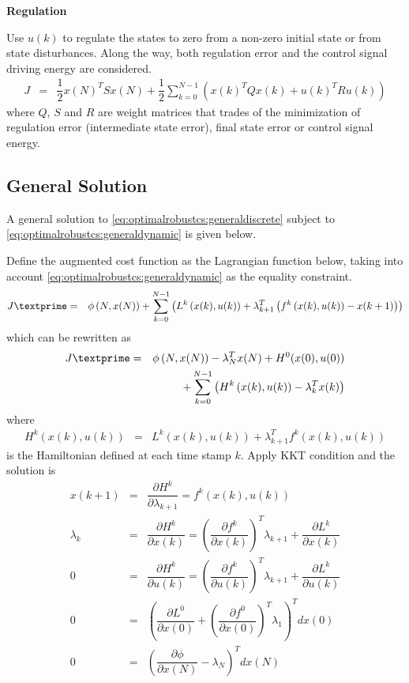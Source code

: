 \vspace{0.1in}
\noindent \textbf{Regulation}
\vspace{0.1in}

Use $u(k)$ to regulate the states to zero  from a non-zero initial state or from state disturbances. Along the way, both regulation error and the control signal driving energy are considered.
\begin{eqnarray}
  J &=& \dfrac{1}{2}x(N)^TSx(N) + \dfrac{1}{2}\sum_{k=0}^{N-1}\left(x(k)^TQx(k) + u(k)^TRu(k)\right) \nonumber
\end{eqnarray}
where $Q$, $S$ and $R$ are weight matrices that trades of the minimization of regulation error (intermediate state error), final state error or control signal energy.

\subsection{General Solution} \label{subsec:optimalrobustcs:optimalgeneralsolution}

A general solution to \eqref{eq:optimalrobustcs:generaldiscrete} subject to \eqref{eq:optimalrobustcs:generaldynamic} is given below.

Define the augmented cost function as the Lagrangian function below, taking into account \eqref{eq:optimalrobustcs:generaldynamic} as the equality constraint.
\begin{eqnarray}
	J\textprime &=& \phi\left(N, x(N)\right) + \sum_{k=0}^{N-1}\left(L^k\left(x(k), u(k)\right) + \lambda_{k+1}^T\left(f^k\left(x(k), u(k)\right) - x(k+1)\right)\right) \nonumber
\end{eqnarray}
which can be rewritten as
\begin{eqnarray}
	J\textprime &=& \phi\left(N, x(N)\right) - \lambda_N^Tx(N) + H^0(x(0), u(0)) \nonumber \\
	&& + \sum_{k=0}^{N-1}\left(H^k\left(x(k), u(k)\right) - \lambda_k^Tx(k)\right) \nonumber
\end{eqnarray}
where
\begin{eqnarray}
	H^k\left(x(k), u(k)\right) &=& L^k\left(x(k), u(k)\right) + \lambda_{k+1}^Tf^k\left(x(k), u(k)\right) \nonumber
\end{eqnarray}
is the Hamiltonian defined at each time stamp $k$. Apply KKT condition and the solution is
\begin{eqnarray}
	x(k+1) &=& \dfrac{\partial H^k}{\partial \lambda_{k+1}} = f^k\left(x(k), u(k)\right) \nonumber \\
	\lambda_k &=& \dfrac{\partial H^k}{\partial x(k)} = \left(\dfrac{\partial f^k}{\partial x(k)}\right)^T\lambda_{k+1} + \dfrac{\partial L^k}{\partial x(k)} \nonumber \\
	0 &=& \dfrac{\partial H^k}{\partial u(k)} = \left(\dfrac{\partial f^k}{\partial u(k)}\right)^T\lambda_{k+1} + \dfrac{\partial L^k}{\partial u(k)} \nonumber \\
	0 &=& \left(\dfrac{\partial L^0}{\partial x(0)} + \left(\dfrac{\partial f^0}{\partial x(0)}\right)^T\lambda_1\right)^Tdx(0) \nonumber \\
	0 &=& \left(\dfrac{\partial \phi}{\partial x(N)}-\lambda_N\right)^Tdx(N) \nonumber
\end{eqnarray}

